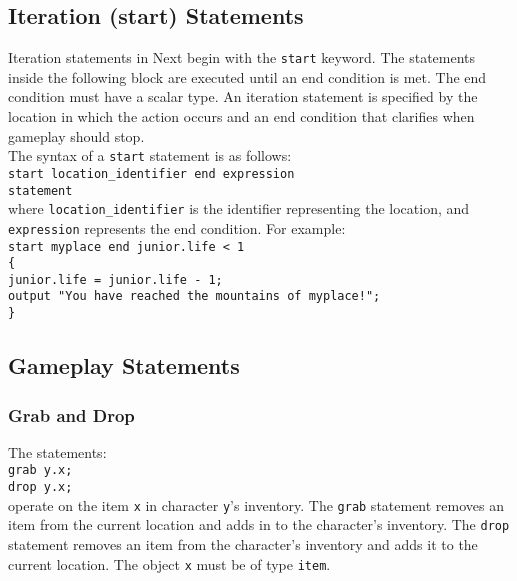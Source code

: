 \documentclass[12pt]{article}
\begin{document}
\subsection{Iteration (start) Statements}

Iteration statements in Next begin with the \texttt{start} keyword.  The statements inside the following block are executed until an end condition is met.  The end condition must have a scalar type.  An iteration statement is specified by the location in which the action occurs and an end condition that clarifies when gameplay should stop. \\

\noindent The syntax of a \texttt{start} statement is as follows: \\

\texttt{start location\_identifier end expression} \\
\indent \indent \texttt{statement} \\

\noindent where \texttt{location\_identifier} is the identifier representing the location, and \texttt{expression} represents the end condition.  For example: \\

\texttt{start myplace end junior.life < 1} \\
\indent \texttt{\{} \\
\indent \indent \texttt{junior.life = junior.life - 1;} \\
\indent \indent \texttt{output "You have reached the mountains of myplace!";} \\
\indent \texttt{\}}

\subsection{Gameplay Statements}
\subsubsection{Grab and Drop}
The statements: \\

\texttt{grab y.x;} \\
\indent \texttt{drop y.x;} \\

\noindent operate on the item \texttt{x} in character \texttt{y}'s inventory.  The \texttt{grab} statement removes an item from the current location and adds in to the character's inventory.  The \texttt{drop} statement removes an item from the character's inventory and adds it to the current location.  The object \texttt{x} must be of type \texttt{item}.
\end{document}
